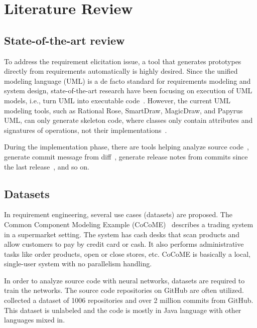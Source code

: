 \chapter{Literature Review}



\section{State-of-the-art review}

To address the requirement elicitation issue, a tool that generates prototypes directly from requirements automatically is highly desired.
Since the unified modeling language (UML) is a de facto standard for requirements modeling and system design,
state-of-the-art research have been focusing on execution of UML models, i.e., turn UML into executable code~\cite{ciccozzi2019execution}.
However, the current UML modeling tools, such as Rational Rose, SmartDraw, MagicDraw, and Papyrus UML, can only generate skeleton code, where classes only contain attributes and signatures of operations, not their implementations~\cite{regep2000using}.

During the implementation phase, there are tools helping analyze source code~\cite{morgachev2019detection,huo2016learning,gu2016deep},
generate commit message from diff~\cite{linares2015changescribe,buse2010automatically,huang2020learning},
generate release notes from commits since the last release~\cite{moreno2016arena}, and so on.


\section{Datasets}
In requirement engineering, several use cases (datasets) are proposed.
The Common Component Modeling Example (CoCoME)~\cite{herold2008cocome} describes a trading system in a supermarket setting.
The system has cash desks that scan products and allow customers to pay by credit card or cash. It also performs administrative tasks like order products, open or close stores, etc.
CoCoME is basically a local, single-user system with no parallelism handling.


In order to analyze source code with neural networks, datasets are required to train the networks. The source code repositories on GitHub are often utilized.
~\cite{jiang2017} collected a dataset of \num{1006} repositories and over 2 million commits from GitHub. This dataset is unlabeled and the code is mostly in Java language with other languages mixed in.

